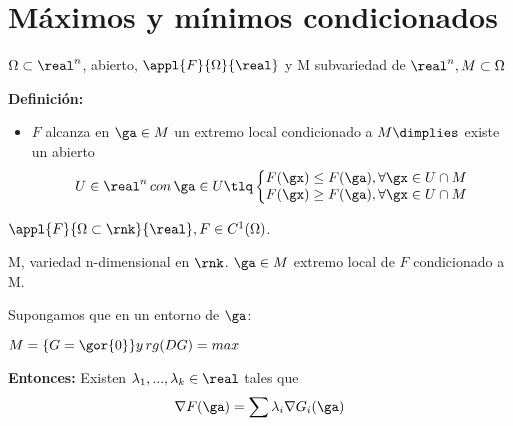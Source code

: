 \section{Máximos y mínimos condicionados}

\begin{defn}
$\Omega\subset\real^n$, abierto, $\appl{F}{\Omega}{\real}$ y M subvariedad de $\real^n, M\subset \Omega$

\textbf{Definición:}

\begin{itemize}
\item $F$ alcanza en $\ga\in M$ un extremo local condicionado a $M \dimplies$ existe un abierto \[U\in\real^n\, con \, \ga\in U \tlq \left\{\begin{matrix} F(\gx) \leq F(\ga), \forall \gx \in U\cap M \\
F(\gx) \geq F(\ga), \forall \gx \in U\cap M \end{matrix}\right.\]
\end{itemize}

\end{defn}


\begin{theorem} \label{thmMultLagrange}
$\appl{F}{\Omega\subset\rnk}{\real}, F\in C^1(\Omega)$.

M, variedad n-dimensional en $\rnk$. $\ga\in M$ extremo local de $F$ condicionado a M.

Supongamos que en un entorno de $\ga$:

$M = \{G = \gor{0}\} y \, rg(DG)=max$

\textbf{Entonces:} Existen $\lambda_1,...,\lambda_k \in \real$ tales que
\[\nabla F(\ga) = \sum \lambda_i \nabla G_i (\ga)\]
\end{theorem}

